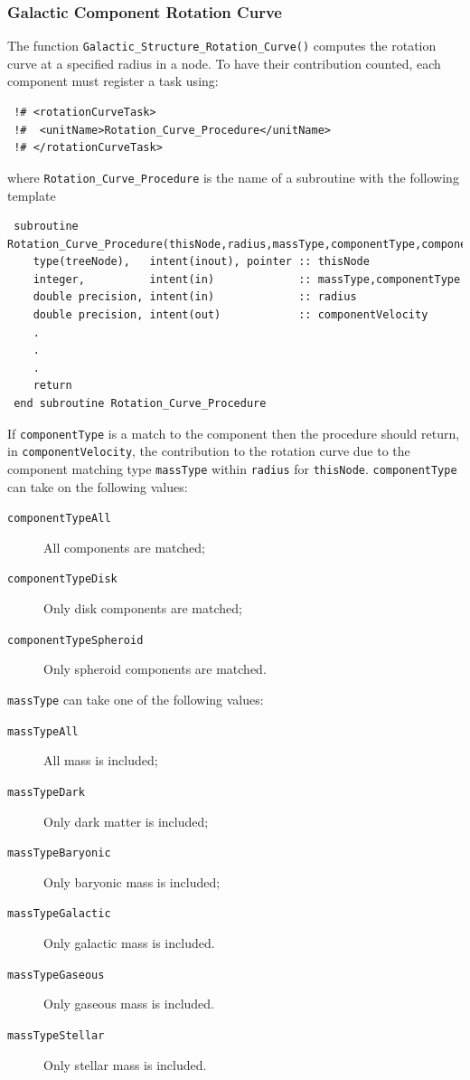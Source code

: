 \subsubsection{Galactic Component Rotation Curve}

The function {\tt Galactic\_Structure\_Rotation\_Curve()} computes the rotation curve at a specified radius in a node. To have their contribution counted, each component must register a task using:
\begin{verbatim}
 !# <rotationCurveTask>
 !#  <unitName>Rotation_Curve_Procedure</unitName>
 !# </rotationCurveTask>
\end{verbatim}
where {\tt Rotation\_Curve\_Procedure} is the name of a subroutine with the following template
\begin{verbatim}
 subroutine Rotation_Curve_Procedure(thisNode,radius,massType,componentType,componentVelocity)
    type(treeNode),   intent(inout), pointer :: thisNode
    integer,          intent(in)             :: massType,componentType
    double precision, intent(in)             :: radius
    double precision, intent(out)            :: componentVelocity
    .
    .
    .
    return
 end subroutine Rotation_Curve_Procedure
\end{verbatim}
If {\tt componentType} is a match to the component then the procedure should return, in {\tt componentVelocity}, the contribution to the rotation curve due to the component matching type {\tt massType} within {\tt radius} for {\tt thisNode}. {\tt componentType} can take on the following values:
\begin{description}
 \item [{\tt componentTypeAll}] All components are matched;
 \item [{\tt componentTypeDisk}] Only disk components are matched;
 \item [{\tt componentTypeSpheroid}] Only spheroid components are matched.
\end{description}
{\tt massType} can take one of the following values:
\begin{description}
 \item [{\tt massTypeAll}] All mass is included;
 \item [{\tt massTypeDark}] Only dark matter is included;
 \item [{\tt massTypeBaryonic}] Only baryonic mass is included;
 \item [{\tt massTypeGalactic}] Only galactic mass is included.
 \item [{\tt massTypeGaseous}] Only gaseous mass is included.
 \item [{\tt massTypeStellar}] Only stellar mass is included.
\end{description}

